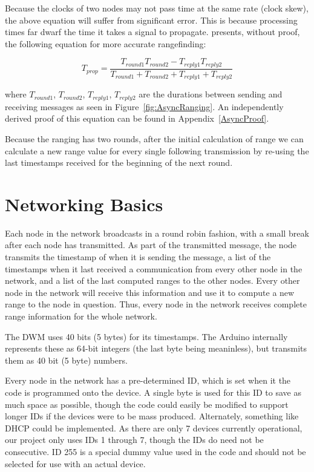 Because the clocks of two nodes may not pass time at the same rate (clock skew), the above equation will suffer from significant error. This is because processing times far dwarf the time it takes a signal to propagate. \parencite{DW1000UserManual} presents, without proof, the following equation for more accurate rangefinding:

\[
	T_{prop} = \frac{T_{round1}  T_{round2} - T_{reply1} T_{reply2}}{T_{round1} + T_{round2} + T_{reply1} + T_{reply2}}
\]

where $T_{round1}$, $T_{round2}$, $T_{reply1}$, $T_{reply2}$ are the durations between sending and receiving messages as seen in Figure~\ref{fig:AsyncRanging}. An independently derived proof of this equation can be found in Appendix~\ref{AsyncProof}.

Because the ranging has two rounds, after the initial calculation of range we can calculate a new range value for every single following transmission by re-using the last timestamps received for the beginning of the next round.

\section{Networking Basics}

Each node in the network broadcasts in a round robin fashion, with a small break after each node has transmitted. As part of the transmitted message, the node transmits the timestamp of when it is sending the message, a list of the timestamps when it last received a communication from every other node in the network, and a list of the last computed ranges to the other nodes. Every other node in the network will receive this information and use it to compute a new range to the node in question. Thus, every node in the network receives complete range information for the whole network.

The DWM uses 40 bits (5 bytes) for its timestamps. The Arduino internally represents these as 64-bit integers (the last byte being meaninless), but transmits them as 40 bit (5 byte) numbers.

Every node in the network has a pre-determined ID, which is set when it the code is programmed onto the device. A single byte is used for this ID to save as much space as possible, though the code could easily be modified to support longer IDs if the devices were to be mass produced. Alternately, something like DHCP could be implemented. As there are only 7 devices currently operational, our project only uses IDs 1 through 7, though the IDs do need not be consecutive. ID 255 is a special dummy value used in the code and should not be selected for use with an actual device.

